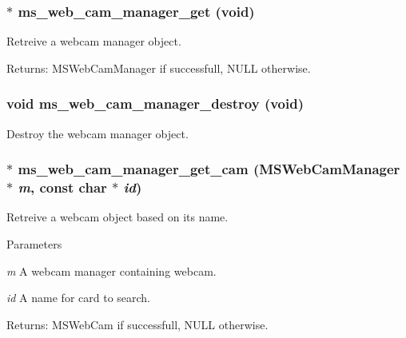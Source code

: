 \subsubsection[{ms\_\-web\_\-cam\_\-manager\_\-get}]{$\ast$ ms\_\-web\_\-cam\_\-manager\_\-get (void)}\label{group__mediastreamer2__webcam_gac2450a52121afa62a04d3a181749106a}
Retreive a webcam manager object.

Returns: MSWebCamManager if successfull, NULL otherwise. 
\subsubsection[{ms\_\-web\_\-cam\_\-manager\_\-destroy}]{\setlength{\rightskip}{0pt plus 5cm}void ms\_\-web\_\-cam\_\-manager\_\-destroy (void)}\label{group__mediastreamer2__webcam_gad0bdda1b1d4103ab66e6894113f560ed}
Destroy the webcam manager object. 
\subsubsection[{ms\_\-web\_\-cam\_\-manager\_\-get\_\-cam}]{$\ast$ ms\_\-web\_\-cam\_\-manager\_\-get\_\-cam ({\bf MSWebCamManager} $\ast$ {\em m}, \/  const char $\ast$ {\em id})}\label{group__mediastreamer2__webcam_ga81198680b1f43995497d97bc2a4ac21c}
Retreive a webcam object based on its name.


\begin{DoxyParams}{Parameters}
\item[{\em m}]A webcam manager containing webcam. \item[{\em id}]A name for card to search.\end{DoxyParams}
Returns: MSWebCam if successfull, NULL otherwise. 
